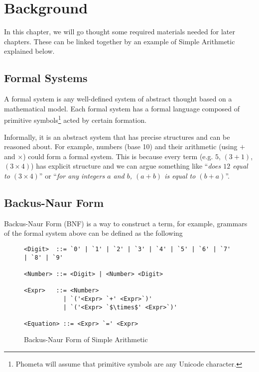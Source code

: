 \documentclass[master.tex]{subfiles}
\begin{document}
\chapter{Background}
\label{chap:background}

In this chapter, we will go thought some required materials needed for later
chapters. These can be linked together by an example of Simple Arithmetic
explained below.

\hspace{1ex}

\section{Formal Systems}

A formal system is any well-defined system of abstract thought based on
a mathematical model\supercite{formal-system-wiki}. Each formal system has a
formal language composed of primitive symbols\footnote{Phometa will assume that
  primitive symbols are any Unicode character.} acted by certain
formation\supercite{formal-system-britannica}.

Informally, it is an abstract system that has precise structures and can be
reasoned about. For example, numbers (base 10) and their arithmetic (using $+$
and $\times$) could form a formal system. This is because every term (e.g. $5$,
$(3 + 1)$, $(3 \times 4)$) has explicit structure and we can argue something
like ``\emph{does $12$ equal to $(3 \times 4)$}'' or ``\emph{for any integers
  $a$ and $b$, $(a + b)$ is equal to $(b + a)$}''.

\hspace{1ex}

\section{Backus-Naur Form}

Backus-Naur Form (BNF) is a way to construct a term, for example, grammars of
the formal system above can be defined as the following

\hspace{1ex}

\begin{figure}[H]
\begin{framed}
\begin{lstlisting}[style=bnf]
<Digit>  ::= `0' | `1' | `2' | `3' | `4' | `5' | `6' | `7' | `8' | `9'

<Number> ::= <Digit> | <Number> <Digit>

<Expr>   ::= <Number>
           | `('<Expr> `+' <Expr>`)'
           | `('<Expr> `$\times$' <Expr>`)'

<Equation> ::= <Expr> `=' <Expr>
\end{lstlisting}
\end{framed}
\caption{Backus-Naur Form of Simple Arithmetic}
\label{fig:background-bnf}
\end{figure}
\end{document}
